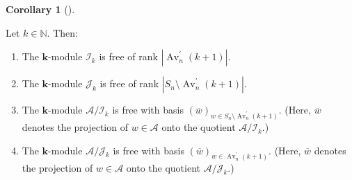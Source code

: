 \documentclass[numbers=enddot,12pt,final,onecolumn,notitlepage]{scrartcl}%
\numberwithin{exer}{subsection}
\theoremstyle{definition}
\newtheorem{coro}[theo]{Corollary}
\newenvironment{corollary}[1][]
{\begin{coro}[#1]\begin{leftbar}}
{\end{leftbar}\end{coro}}
\begin{document}
\begin{corollary}
\label{cor.row.twin}Let $k\in\mathbb{N}$. Then:

\begin{enumerate}
\item[\textbf{(a)}] The $\mathbf{k}$-module $\mathcal{I}_{k}$ is free of rank
$\left\vert \operatorname*{Av}\nolimits_{n}^{\prime}\left(  k+1\right)
\right\vert $.

\item[\textbf{(b)}] The $\mathbf{k}$-module $\mathcal{J}_{k}$ is free of rank
$\left\vert S_{n}\setminus\operatorname*{Av}\nolimits_{n}^{\prime}\left(
k+1\right)  \right\vert $.

\item[\textbf{(c)}] The $\mathbf{k}$-module $\mathcal{A}/\mathcal{I}_{k}$ is
free with basis $\left(  \overline{w}\right)  _{w\in S_{n}\setminus
\operatorname*{Av}\nolimits_{n}^{\prime}\left(  k+1\right)  }$. (Here,
$\overline{w}$ denotes the projection of $w\in\mathcal{A}$ onto the quotient
$\mathcal{A}/\mathcal{I}_{k}$.)

\item[\textbf{(d)}] The $\mathbf{k}$-module $\mathcal{A}/\mathcal{J}_{k}$ is
free with basis $\left(  \overline{w}\right)  _{w\in\operatorname*{Av}%
\nolimits_{n}^{\prime}\left(  k+1\right)  }$. (Here, $\overline{w}$ denotes
the projection of $w\in\mathcal{A}$ onto the quotient $\mathcal{A}%
/\mathcal{J}_{k}$.)
\end{enumerate}
\end{corollary}
\end{document}
